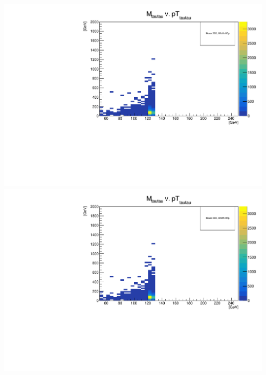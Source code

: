 \documentclass[a4wide,10pt]{article}
\begin{document}
\includegraphics[scale=0.50,page=40]{../Pdfs/ditau_Mass_Versus_ditau_TransverseMomentum_VaryingWidths.pdf}
\includegraphics[scale=0.50,page=41]{../Pdfs/ditau_Mass_Versus_ditau_TransverseMomentum_VaryingWidths.pdf}
\end{document}
